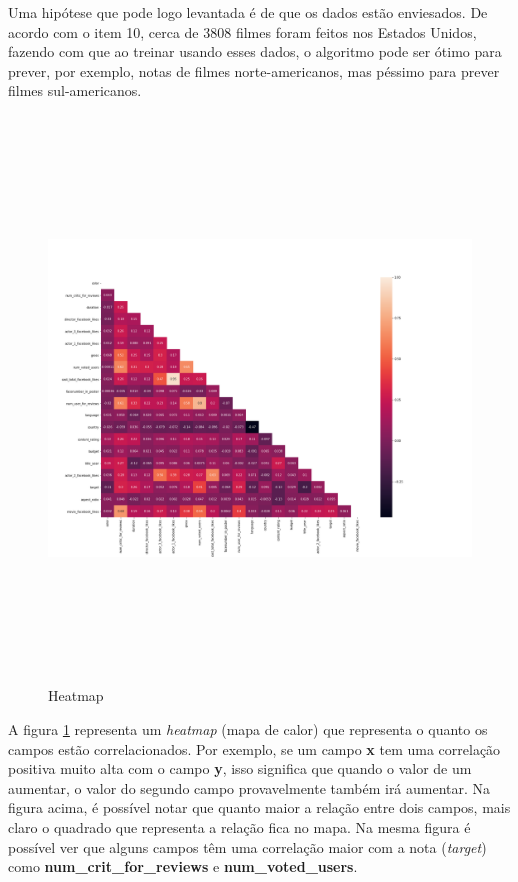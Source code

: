 Uma hipótese que pode logo levantada é de que os dados estão enviesados. De acordo com o item 10, cerca de 3808 filmes foram feitos nos Estados Unidos, fazendo com que ao treinar usando esses dados, o algoritmo pode ser ótimo para prever, por exemplo, notas de filmes norte-americanos, mas péssimo para prever filmes sul-americanos.

\begin{figure}[H]
\centering
\includegraphics[height=15cm]{imagens/heatmap.png}
\caption{Heatmap}
\label{heatmap}
\end{figure}

A figura \ref{heatmap} representa um \textit{heatmap} (mapa de calor) que representa o quanto os campos estão correlacionados. Por exemplo, se um campo \textbf{x} tem uma correlação positiva muito alta com o campo \textbf{y}, isso significa que quando o valor de um aumentar, o valor do segundo campo provavelmente também irá aumentar. Na figura acima, é possível notar que quanto maior a relação entre dois campos, mais claro o quadrado que representa a relação fica no mapa. 
Na mesma figura é possível ver que alguns campos têm uma correlação maior com a nota (\textit{target}) como \textbf{num\_crit\_for\_reviews} e \textbf{num\_voted\_users}. 

